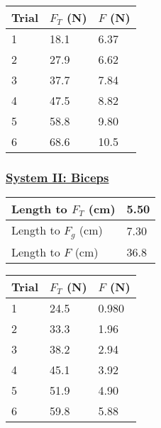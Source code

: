 \documentclass[fleqn]{article}
\begin{document}
\begin{table}[H]
	\setlength{\extrarowheight}{2pt}
	\centering
	\begin{tabularx}{\textwidth}{|X|X|X|}
		\rowcolor{gray!50}
		\hline
		Trial & $F_T$ (N) & $F$ (N) \\
		\hline
		1     & 18.1      & 6.37    \\
		\hline
		2     & 27.9      & 6.62    \\
		\hline
		3     & 37.7      & 7.84    \\
		\hline
		4     & 47.5      & 8.82    \\
		\hline
		5     & 58.8      & 9.80    \\
		\hline
		6     & 68.6      & 10.5    \\
		\hline
	\end{tabularx}
\end{table}

\subsubsection*{\underline{System II: Biceps}}
\begin{table}[H]
	\setlength{\extrarowheight}{2pt}
	\centering
	\begin{tabularx}{\textwidth}{|X|X|}
		\hline
		Length to $F_T$ (cm) & 5.50 \\ \hline
		Length to $F_g$ (cm) & 7.30 \\ \hline
		Length to $F$ (cm)   & 36.8 \\ \hline
	\end{tabularx}
\end{table}

\begin{table}[H]
	\setlength{\extrarowheight}{2pt}
	\centering
	\begin{tabularx}{\textwidth}{|X|X|X|}
		\rowcolor{gray!50}
		\hline
		Trial & $F_T$ (N) & $F$ (N) \\ \hline
		1     & 24.5      & 0.980   \\ \hline
		2     & 33.3      & 1.96    \\ \hline
		3     & 38.2      & 2.94    \\ \hline
		4     & 45.1      & 3.92    \\ \hline
		5     & 51.9      & 4.90    \\ \hline
		6     & 59.8      & 5.88    \\ \hline
	\end{tabularx}
\end{table}
\end{document}
